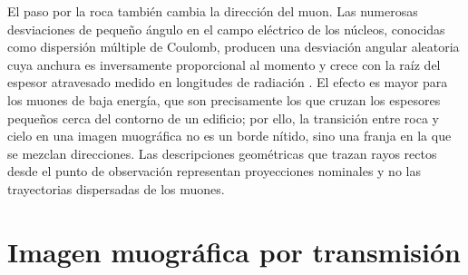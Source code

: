 El paso por la roca también cambia la dirección del muon. Las numerosas desviaciones de pequeño ángulo en el campo eléctrico de los núcleos, conocidas como dispersión múltiple de Coulomb, producen una desviación angular aleatoria cuya anchura es inversamente proporcional al momento y crece con la raíz del espesor atravesado medido en longitudes de radiación \parencite{pdg2022}. El efecto es mayor para los muones de baja energía, que son precisamente los que cruzan los espesores pequeños cerca del contorno de un edificio; por ello, la transición entre roca y cielo en una imagen muográfica no es un borde nítido, sino una franja en la que se mezclan direcciones. Las descripciones geométricas que trazan rayos rectos desde el punto de observación representan proyecciones nominales y no las trayectorias dispersadas de los muones.

\section{Imagen muográfica por transmisión}
\label{sec:mt-imagen}

